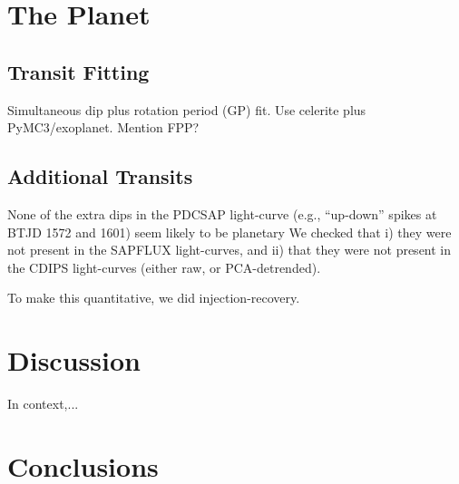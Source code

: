\documentclass[12pt,twocolumn,tighten]{aastex62}
\begin{document}
\section{The Planet}
\label{sec:planet}

\subsection{Transit Fitting}
Simultaneous dip plus rotation period (GP) fit. Use celerite plus PyMC3/exoplanet.
Mention FPP?


\subsection{Additional Transits}

None of the extra dips in the PDCSAP light-curve (e.g., ``up-down''
spikes at BTJD 1572 and 1601) seem likely to be planetary
We checked that i) they were not present in the SAPFLUX light-curves,
and ii) that they were not present in the CDIPS light-curves (either
raw, or PCA-detrended).

To make this quantitative, we did injection-recovery.





\section{Discussion}
\label{sec:discussion}

In context,...


\section{Conclusions}
\label{sec:conclusions}




\end{document}
